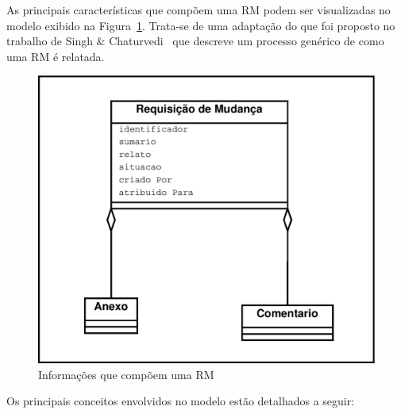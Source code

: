 As principais características que compõem uma RM podem ser visualizadas no
modelo exibido na
Figura~\ref{fig:diagrama-classe-atributos-requisicao-mudancas}. Trata-se de uma
adaptação do que foi proposto no trabalho de Singh \&
Chaturvedi~\cite{singh2011bug} que descreve um processo genérico de como uma RM
é relatada.

\begin{figure}[htpb]
	\centering
	\includegraphics[width=0.5\linewidth]{./chapter-manutencao-software-visao-geral/img/diagrama-classe-atributos-requisicao-mudancas.pdf}
	\caption{Informações que compõem uma RM}
\label{fig:diagrama-classe-atributos-requisicao-mudancas}
\end{figure}

Os principais conceitos envolvidos no modelo estão detalhados a seguir:

